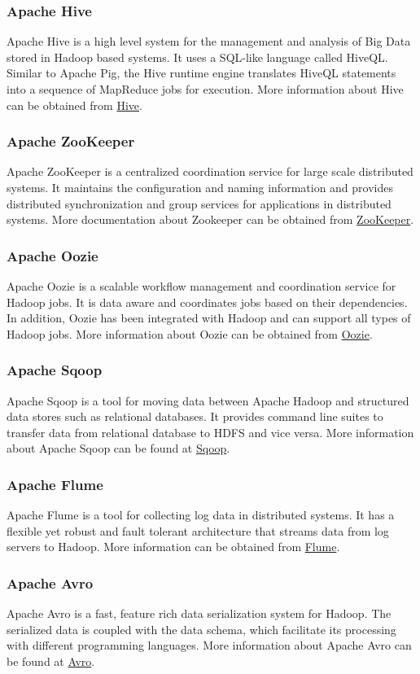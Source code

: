 \subsubsection*{Apache Hive}
Apache Hive is a high level system for the management and analysis of Big Data stored in Hadoop based systems. It uses a SQL-like language called HiveQL. Similar to Apache Pig, the Hive runtime engine translates HiveQL statements into a sequence of MapReduce jobs for execution. More information about Hive can be obtained from \href{http://hive.apache.org}{Hive}.
\subsubsection*{Apache ZooKeeper}
Apache ZooKeeper is a centralized coordination service for large scale distributed systems. It maintains the configuration and naming information and provides distributed synchronization and group services for applications in distributed systems. More documentation about Zookeeper can be obtained from \href{http://zookeeper.apache.org}{ZooKeeper}.
\subsubsection*{Apache Oozie}
Apache Oozie is a scalable workflow management and coordination service for Hadoop jobs. It is data aware and coordinates jobs based on their dependencies. In addition, Oozie has been integrated with Hadoop and can support all types of Hadoop jobs. More information about Oozie can be obtained from \href{http://oozie.apache.org}{Oozie}.
\subsubsection*{Apache Sqoop}
Apache Sqoop is a tool for moving data between Apache Hadoop and structured data stores such as relational databases. It provides command line suites to transfer data from relational database to HDFS and vice versa. More information about Apache Sqoop can be found at \href{http://sqoop.apache.org}{Sqoop}.
\subsubsection*{Apache Flume}
Apache Flume is a tool for collecting log data in distributed systems. It has a flexible yet robust and fault tolerant architecture that streams data from log servers to Hadoop. More information can be obtained from \href{http://flume.apache.org}{Flume}.
\subsubsection*{Apache Avro}
Apache Avro is a fast, feature rich data serialization system for Hadoop. The serialized data is coupled with the data schema, which facilitate its processing with different programming languages.  More information about Apache Avro can be found at \href{http://avro.apache.org}{Avro}.
